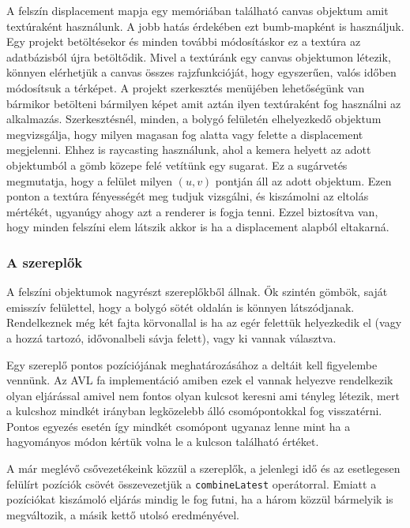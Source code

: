 A felszín displacement mapja egy memóriában található canvas objektum amit textúraként használunk. A jobb hatás érdekében ezt bumb-mapként \cite{Bump} is használjuk. Egy projekt betöltésekor és minden további módosításkor ez a textúra az adatbázisból újra betöltődik. Mivel a textúránk egy canvas objektumon létezik, könnyen elérhetjük a canvas összes rajzfunkcióját, hogy egyszerűen, valós időben módosítsuk a térképet. A projekt szerkesztés menüjében lehetőségünk van bármikor betölteni bármilyen képet amit aztán ilyen textúraként fog használni az alkalmazás. Szerkesztésnél, minden, a bolygó felületén elhelyezkedő objektum megvizsgálja, hogy milyen magasan fog alatta vagy felette a displacement megjelenni. Ehhez is raycasting használunk, ahol a kemera helyett az adott objektumból a gömb közepe felé vetítünk egy sugarat. Ez a sugárvetés megmutatja, hogy a felület milyen $(u, v)$ pontján áll az adott objektum. Ezen ponton a textúra fényességét meg tudjuk vizsgálni, és kiszámolni az eltolás mértékét, ugyanúgy ahogy azt a renderer is fogja tenni. Ezzel biztosítva van, hogy minden felszíni elem látszik akkor is ha a displacement alapból eltakarná.

\subsubsection{A szereplők}

A felszíni objektumok nagyrészt szereplőkből állnak. Ők szintén gömbök, saját emisszív felülettel, hogy a bolygó sötét oldalán is könnyen látszódjanak. Rendelkeznek még két fajta körvonallal is ha az egér felettük helyezkedik el (vagy a hozzá tartozó, idővonalbeli sávja felett), vagy ki vannak választva.

Egy szereplő pontos pozíciójának meghatározásához a deltáit kell figyelembe vennünk. Az AVL fa implementáció amiben ezek el vannak helyezve rendelkezik olyan eljárással amivel nem fontos olyan kulcsot keresni ami tényleg létezik, mert a kulcshoz mindkét irányban legközelebb álló csomópontokkal fog visszatérni. Pontos egyezés esetén így mindkét csomópont ugyanaz lenne mint ha a hagyományos módon kértük volna le a kulcson található értéket.

A már meglévő csővezetékeink közzül a szereplők, a jelenlegi idő és az esetlegesen felülírt pozíciók csövét összevezetjük a \lstinline[columns=fixed]{combineLatest} operátorral. Emiatt a pozíciókat kiszámoló eljárás mindig le fog futni, ha a három közzül bármelyik is megváltozik, a másik kettő utolsó eredményével.

